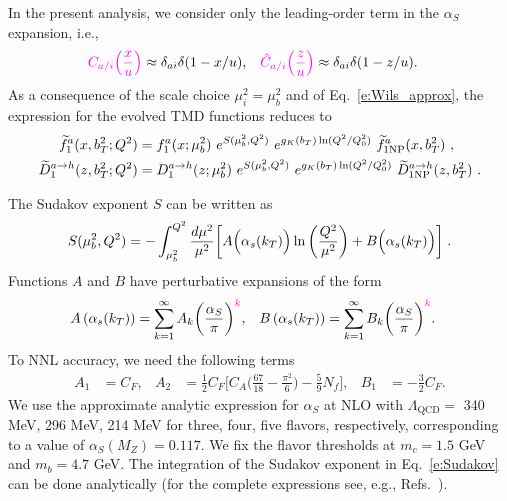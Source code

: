 \documentclass[aps,preprintnumbers,showpacs,nofootinbib,superscriptaddress,floatfix]{revtex4}
\newcommand{\AS}[1]{{\textcolor[rgb]{1,0,1}{#1}}}
\newcommand{\bT}{b_T}
\begin{document}
In the present analysis, we consider only the leading-order term
in the $\alpha_S$ expansion, i.e., 
\begin{align} 
\AS{C_{a/i} \Big( \frac{x}{u} \Big)} &\approx
\delta_{ai} \delta(1-x/u),
&
\AS{\hat{C}_{a/i} \Big( \frac{z}{u} \Big)} &\approx
\delta_{ai} \delta(1-z/u).
\label{e:Wils_approx}
\end{align}  
As a consequence \AS{of the scale choice $\mu_i^2=\mu_b^2$ and of Eq.~\eqref{e:Wils_approx}}, the expression for the evolved TMD functions reduces to
\begin{align}   
\widetilde{f}_1^a (x,  \bT^2; Q^2) &= f_1^a (x ; \mu_b^2) 
\  e^{S (\mu_b^2, Q^2)} \  e^{g_K(\bT) \ln (Q^2 / Q_0^2)} \  \widetilde{f}_{1 {\rm NP}}^a (x, \bT^2) \ ,
\label{e:TMDevol1b} \\
\widetilde{D}_1^{a\to h} (z, \bT^2; Q^2) &= D_1^{a\to h} (z; \mu_b^2) \  e^{S (\mu_b^2, Q^2)} \  e^{g_K( \bT) \ln (Q^2 / Q_0^2)} \  \widetilde{D}_{1 {\rm NP}}^{a\to h} (z, \bT^2) \  .
\label{e:TMDevol2b}
\end{align}

The Sudakov exponent $S$ 
can be written as
\begin{equation} 
S(\mu_b^2,Q^2)=-\int_{\mu_b^2}^{Q^2}{d\mu^2\over \mu^2}
\bigg[A\Big(\alpha_s(k_T)\Big)\ln\bigg({Q^2\over \mu^2}\bigg) 
+ B\Big(\alpha_s(k_T)\Big) \bigg] \;.
\label{e:Sudakov} 
\end{equation} 
Functions $A$ and $B$ have perturbative expansions of the form
\begin{align}
A\left(\alpha_s(k_T)\right) &= \sum_{k=1}^{\infty}A_k
\bigg(\frac{\alpha_S}{\pi} \bigg)^{\AS{k}},
&
B\left(\alpha_s(k_T)\right) &= \sum_{k=1}^{\infty}B_k
\bigg(\frac{\alpha_S}{\pi} \bigg)^{\AS{k}}.
\end{align} 
To NNL accuracy, we need the following 
terms~\cite{Davies:1984hs,Collins:1984kg,Bacchetta:2015ora}
\begin{align}
A_1&= C_F, 
&
A_2&=
\frac{1}{2} C_F  \bigg[
C_A \bigg( \frac{67}{18} - \frac{\pi^2}{6} \bigg)
- \frac{5}{9} N_f \bigg],
&
B_1&= - \frac{3}{2}C_F.
\end{align} 
We use the approximate analytic expression for $\alpha_S$ at NLO with 
$\Lambda_{\text{QCD}}=$ 340 MeV, 296 MeV, 214 MeV for three, four, five
flavors, respectively, corresponding to a value of $\alpha_S(M_Z)=0.117$. 
We fix the flavor thresholds at $m_c=1.5$ GeV and 
$m_b= 4.7$ GeV. The integration of the Sudakov exponent in
Eq.~\eqref{e:Sudakov} can
be done analytically (for the complete expressions see, e.g.,
Refs.~\cite{Frixione:1998dw,Bozzi:2005wk,Echevarria:2012pw}).  
\end{document}
